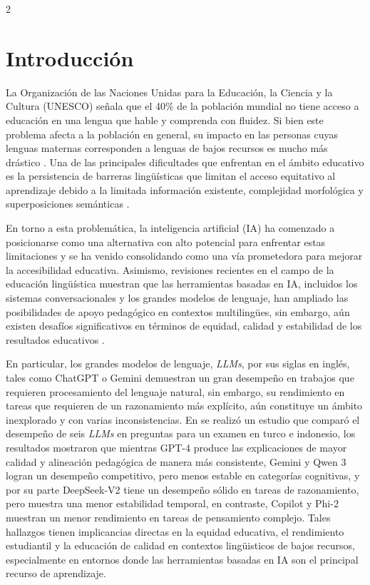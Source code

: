 \documentclass[12pt,twoside,titlepage]{ingenius}
\begin{document}
\newpage

\begin{multicols}{2}
\section{Introducción}
\vspace{-0.15cm}

La Organización de las Naciones Unidas para la Educación, la Ciencia y la Cultura (UNESCO) señala que el 40\% de la población mundial no tiene acceso a
educación en una lengua que hable y comprenda con fluidez. Si bien este problema afecta a la población en general, su impacto en las personas cuyas lenguas
maternas corresponden a lenguas de bajos recursos es mucho más drástico  \cite{UNESCO}. Una de las principales dificultades que enfrentan en el ámbito educativo es la persistencia de barreras lingüísticas que limitan el acceso equitativo al aprendizaje debido a la limitada información existente, complejidad morfológica y superposiciones semánticas \cite{Demilie2026,Tafa2025}. 
 

En torno a esta problemática, la inteligencia artificial (IA) ha comenzado a posicionarse como una alternativa con alto potencial para enfrentar estas limitaciones y se ha venido consolidando como una vía prometedora para mejorar la accesibilidad educativa. 
Asimismo, revisiones recientes en el campo de la educación lingüística muestran que las herramientas basadas en IA, incluidos los sistemas
conversacionales y los grandes modelos de lenguaje, han ampliado las posibilidades de apoyo pedagógico en contextos multilingües, sin embargo, aún existen desafíos significativos en términos de equidad, calidad y estabilidad de los resultados educativos \cite{BeldaMedina2022,Nwafor2026,Nouzri2025,Tebourbi2025}.


En particular, los grandes modelos de lenguaje, \textit{LLMs}, por sus siglas en inglés, tales como ChatGPT o Gemini demuestran un gran desempeño en trabajos que requieren procesamiento del lenguaje natural, sin embargo, su rendimiento en tareas que requieren de un razonamiento más explícito, aún constituye un ámbito inexplorado y con varias inconsistencias. En \cite{Onan2026} se realizó un estudio que comparó el desempeño de seis \textit{LLMs} en preguntas para un examen en turco e indonesio, los resultados mostraron que mientras GPT-4 produce las explicaciones de mayor calidad y alineación pedagógica de manera más consistente, Gemini y Qwen 3 logran un desempeño competitivo, pero menos estable en categorías cognitivas, y por su parte DeepSeek-V2 tiene un desempeño sólido en tareas de razonamiento, pero muestra una menor estabilidad temporal, en contraste, Copilot y Phi-2 muestran un menor rendimiento en tareas de pensamiento complejo. Tales hallazgos tienen implicancias directas en la equidad educativa, el rendimiento estudiantil y la educación de calidad en contextos lingüisticos de bajos recursos, especialmente en entornos donde las herramientas basadas en IA son el principal recurso de aprendizaje. 



\end{multicols}
\end{document}
